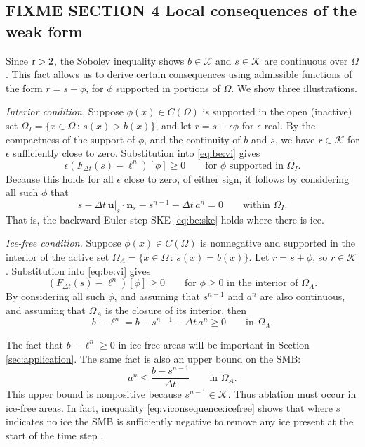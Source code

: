 \documentclass[hidelinks,onefignum,onetabnum,final]{siamart220329}  %
\newcommand{\eps}{\epsilon}
\newcommand{\bn}{\mathbf{n}}
\newcommand{\bu}{\mathbf{u}}
\newcommand{\cK}{\mathcal{K}}
\newcommand{\cX}{\mathcal{X}}
\newcommand{\rr}{{\text{\textnormal{r}}}}
\begin{document}
\subsection{FIXME SECTION 4 Local consequences of the weak form} \label{subsec:viconsequences}  Since $\rr>2$, the Sobolev inequality shows $b\in\cX$ and $s\in\cK$ are continuous over $\bar\Omega$.  This fact allows us to derive certain consequences using admissible functions of the form $r=s+\phi$, for $\phi$ supported in portions of $\Omega$.  We show three illustrations.

\smallskip
\emph{Interior condition.}  Suppose $\phi(x) \in C(\Omega)$ is supported in the open (inactive) set $\Omega_I=\{x\in\Omega\,:\,s(x)>b(x)\}$, and let $r=s+\eps\phi$ for $\eps$ real.  By the compactness of the support of $\phi$, and the continuity of $b$ and $s$, we have $r\in\cK$ for $\eps$ sufficiently close to zero.  Substitution into \eqref{eq:be:vi} gives
\begin{equation}
\eps\left(F_{\Delta t}(s) - \ell^n\right)[\phi] \ge 0 \qquad \text{for $\phi$ supported in $\Omega_I$.}
\end{equation}
Because this holds for all $\eps$ close to zero, of either sign, it follows by considering all such $\phi$ that
\begin{equation}
s - \Delta t\, \bu|_s \cdot \bn_s - s^{n-1} - \Delta t\,a^n = 0 \qquad \text{within } \Omega_I.
\end{equation}
That is, the backward Euler step SKE \eqref{eq:be:ske} holds where there is ice.

\smallskip
\emph{Ice-free condition.}  Suppose $\phi(x) \in C(\Omega)$ is nonnegative and supported in the interior of the active set $\Omega_A=\{x\in\Omega\,:\,s(x)=b(x)\}$.  Let $r=s+\phi$, so $r\in\cK$.  Substitution into \eqref{eq:be:vi} gives
\begin{equation}
\left(F_{\Delta t}(s) - \ell^n\right)[\phi] \ge 0 \qquad \text{for $\phi\ge 0$ in the interior of $\Omega_A$.}
\end{equation}
By considering all such $\phi$, and assuming that $s^{n-1}$ and $a^n$ are also continuous, and assuming that $\Omega_A$ is the closure of its interior, then
\begin{equation}
b-\ell^n = b - s^{n-1} - \Delta t\,a^n \ge 0 \qquad \text{in } \Omega_A.
\end{equation}

The fact that $b-\ell^n\ge 0$ in ice-free areas will be important in Section \ref{sec:application}.  The same fact is also an upper bound on the SMB:
\begin{equation}
a^n \le \frac{b - s^{n-1}}{\Delta t} \qquad \text{in } \Omega_A. \label{eq:viconsequence:icefree}
\end{equation}
This upper bound is nonpositive because $s^{n-1}\in\cK$.  Thus ablation must occur in ice-free areas.  In fact, inequality \eqref{eq:viconsequence:icefree} shows that where $s$ indicates no ice the SMB is sufficiently negative to remove any ice present at the start of the time step \cite{Bueler2021conservation}.
\end{document}
